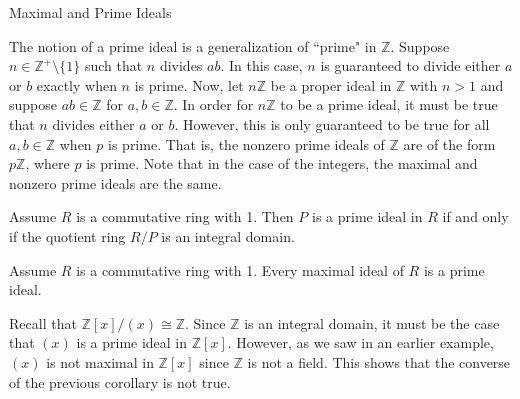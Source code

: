 \begin{section}{Maximal and Prime Ideals}
\begin{remark}
The notion of a prime ideal is a generalization of ``prime" in $\mathbb{Z}$. Suppose $n\in\mathbb{Z}^+\setminus\{1\}$ such that $n$ divides $ab$.  In this case, $n$ is guaranteed to divide either $a$ or $b$ exactly when $n$ is prime.  Now, let $n\mathbb{Z}$ be a proper ideal in $\mathbb{Z}$ with $n>1$ and suppose $ab\in \mathbb{Z}$ for $a,b\in\mathbb{Z}$. In order for $n\mathbb{Z}$ to be a prime ideal, it must be true that $n$ divides either $a$ or $b$.  However, this is only guaranteed to be true for all $a,b\in\mathbb{Z}$ when $p$ is prime.  That is, the nonzero prime ideals of $\mathbb{Z}$ are of the form $p\mathbb{Z}$, where $p$ is prime.  Note that in the case of the integers, the maximal and nonzero prime ideals are the same.
\end{remark}

\begin{theorem}
Assume $R$ is a commutative ring with 1.  Then $P$ is a prime ideal in $R$ if and only if the quotient ring $R/P$ is an integral domain.
\end{theorem}

\begin{corollary}
Assume $R$ is a commutative ring with 1.  Every maximal ideal of $R$ is a prime ideal.
\end{corollary}

\begin{example}
Recall that $\mathbb{Z}[x]/(x)\cong\mathbb{Z}$.  Since $\mathbb{Z}$ is an integral domain, it must be the case that $(x)$ is a prime ideal in $\mathbb{Z}[x]$.  However, as we saw in an earlier example, $(x)$ is not maximal in $\mathbb{Z}[x]$ since $\mathbb{Z}$ is not a field.  This shows that the converse of the previous corollary is not true.
\end{example}

\end{section}